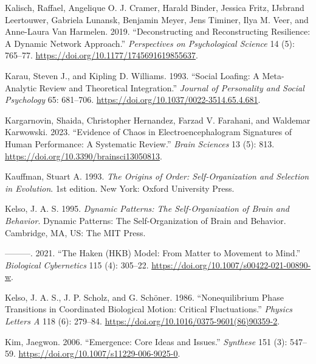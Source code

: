 \documentclass[
  a4paper,
  DIV=11,
  numbers=noendperiod,
  oneside]{scrreprt}
\newlength{\cslhangindent}
\newlength{\cslentryspacingunit} %
\newenvironment{CSLReferences}[2] %
 {%
  \setlength{\parindent}{0pt}
  \ifodd #1
  \let\oldpar\par
  \def\par{\hangindent=\cslhangindent\oldpar}
  \fi
  \setlength{\parskip}{#2\cslentryspacingunit}
 }%
 {}
\begin{document}
\begin{CSLReferences}{1}{0}
\leavevmode{}%
Kalisch, Raffael, Angelique O. J. Cramer, Harald Binder, Jessica Fritz,
IJsbrand Leertouwer, Gabriela Lunansk, Benjamin Meyer, Jens Timiner,
Ilya M. Veer, and Anne-Laura Van Harmelen. 2019. {``Deconstructing and
Reconstructing Resilience: A Dynamic Network Approach.''}
\emph{Perspectives on Psychological Science} 14 (5): 765--77.
\url{https://doi.org/10.1177/1745691619855637}.

\leavevmode{}%
Karau, Steven J., and Kipling D. Williams. 1993. {``Social Loafing: {A}
Meta-Analytic Review and Theoretical Integration.''} \emph{Journal of
Personality and Social Psychology} 65: 681--706.
\url{https://doi.org/10.1037/0022-3514.65.4.681}.

\leavevmode{}%
Kargarnovin, Shaida, Christopher Hernandez, Farzad V. Farahani, and
Waldemar Karwowski. 2023. {``Evidence of Chaos in Electroencephalogram
Signatures of Human Performance: A Systematic Review.''} \emph{Brain
Sciences} 13 (5): 813. \url{https://doi.org/10.3390/brainsci13050813}.

\leavevmode{}%
Kauffman, Stuart A. 1993. \emph{The {Origins} of {Order}:
{Self-Organization} and {Selection} in {Evolution}}. 1st edition. {New
York}: {Oxford University Press}.

\leavevmode{}%
Kelso, J. A. S. 1995. \emph{Dynamic Patterns: {The} Self-Organization of
Brain and Behavior}. Dynamic Patterns: {The} Self-Organization of Brain
and Behavior. {Cambridge, MA, US}: {The MIT Press}.

\leavevmode{}%
---------. 2021. {``The {Haken}
({HKB}) Model: From Matter to Movement to Mind.''} \emph{Biological
Cybernetics} 115 (4): 305--22.
\url{https://doi.org/10.1007/s00422-021-00890-w}.

\leavevmode{}%
Kelso, J. A. S., J. P. Scholz, and G. Schöner. 1986. {``Nonequilibrium
Phase Transitions in Coordinated Biological Motion: Critical
Fluctuations.''} \emph{Physics Letters A} 118 (6): 279--84.
\url{https://doi.org/10.1016/0375-9601(86)90359-2}.

\leavevmode{}%
Kim, Jaegwon. 2006. {``Emergence: {Core} Ideas and Issues.''}
\emph{Synthese} 151 (3): 547--59.
\url{https://doi.org/10.1007/s11229-006-9025-0}.


\end{CSLReferences}
\end{document}
